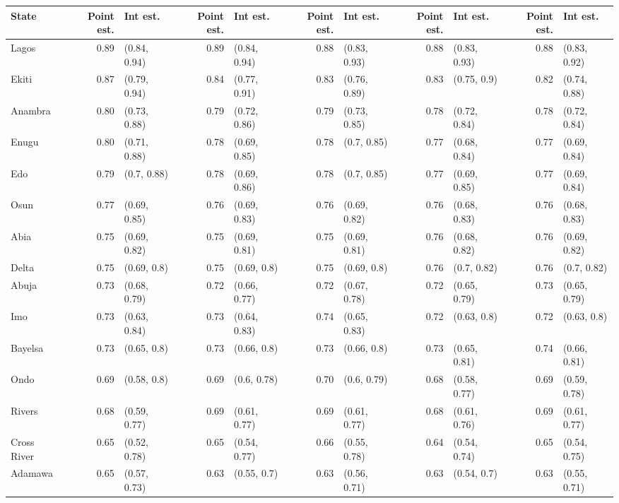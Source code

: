 
\begin{tabular}{lrlrlrlrlrl}
\toprule
State & Point est. & Int est. & Point est. & Int est. & Point est. & Int est. & Point est. & Int est. & Point est. & Int est.\\
\midrule
Lagos & 0.89 & (0.84, 0.94) & 0.89 & (0.84, 0.94) & 0.88 & (0.83, 0.93) & 0.88 & (0.83, 0.93) & 0.88 & (0.83, 0.92)\\
Ekiti & 0.87 & (0.79, 0.94) & 0.84 & (0.77, 0.91) & 0.83 & (0.76, 0.89) & 0.83 & (0.75, 0.9) & 0.82 & (0.74, 0.88)\\
Anambra & 0.80 & (0.73, 0.88) & 0.79 & (0.72, 0.86) & 0.79 & (0.73, 0.85) & 0.78 & (0.72, 0.84) & 0.78 & (0.72, 0.84)\\
Enugu & 0.80 & (0.71, 0.88) & 0.78 & (0.69, 0.85) & 0.78 & (0.7, 0.85) & 0.77 & (0.68, 0.84) & 0.77 & (0.69, 0.84)\\
Edo & 0.79 & (0.7, 0.88) & 0.78 & (0.69, 0.86) & 0.78 & (0.7, 0.85) & 0.77 & (0.69, 0.85) & 0.77 & (0.69, 0.84)\\
Osun & 0.77 & (0.69, 0.85) & 0.76 & (0.69, 0.83) & 0.76 & (0.69, 0.82) & 0.76 & (0.68, 0.83) & 0.76 & (0.68, 0.83)\\
Abia & 0.75 & (0.69, 0.82) & 0.75 & (0.69, 0.81) & 0.75 & (0.69, 0.81) & 0.76 & (0.68, 0.82) & 0.76 & (0.69, 0.82)\\
Delta & 0.75 & (0.69, 0.8) & 0.75 & (0.69, 0.8) & 0.75 & (0.69, 0.8) & 0.76 & (0.7, 0.82) & 0.76 & (0.7, 0.82)\\
Abuja & 0.73 & (0.68, 0.79) & 0.72 & (0.66, 0.77) & 0.72 & (0.67, 0.78) & 0.72 & (0.65, 0.79) & 0.73 & (0.65, 0.79)\\
Imo & 0.73 & (0.63, 0.84) & 0.73 & (0.64, 0.83) & 0.74 & (0.65, 0.83) & 0.72 & (0.63, 0.8) & 0.72 & (0.63, 0.8)\\
Bayelsa & 0.73 & (0.65, 0.8) & 0.73 & (0.66, 0.8) & 0.73 & (0.66, 0.8) & 0.73 & (0.65, 0.81) & 0.74 & (0.66, 0.81)\\
Ondo & 0.69 & (0.58, 0.8) & 0.69 & (0.6, 0.78) & 0.70 & (0.6, 0.79) & 0.68 & (0.58, 0.77) & 0.69 & (0.59, 0.78)\\
Rivers & 0.68 & (0.59, 0.77) & 0.69 & (0.61, 0.77) & 0.69 & (0.61, 0.77) & 0.68 & (0.61, 0.76) & 0.69 & (0.61, 0.77)\\
Cross River & 0.65 & (0.52, 0.78) & 0.65 & (0.54, 0.77) & 0.66 & (0.55, 0.78) & 0.64 & (0.54, 0.74) & 0.65 & (0.54, 0.75)\\
Adamawa & 0.65 & (0.57, 0.73) & 0.63 & (0.55, 0.7) & 0.63 & (0.56, 0.71) & 0.63 & (0.54, 0.7) & 0.63 & (0.55, 0.71)\\

\end{tabular}
